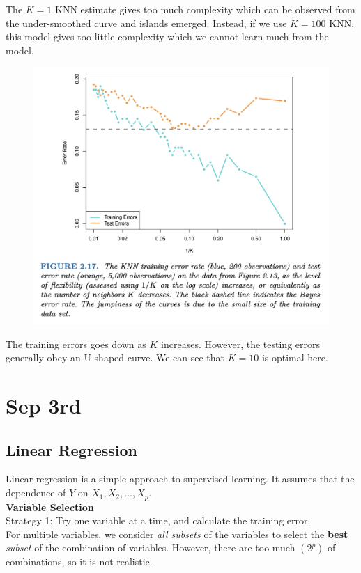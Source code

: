 \documentclass{article}
\begin{document}
The $K=1$ KNN estimate gives too much complexity which can be observed from the under-smoothed curve and islands emerged. Instead, if we use $K=100$ KNN, this model gives too little complexity which we cannot learn much from the model.
\newpage
\begin{figure}[h!]
    \centering
    \includegraphics[width=0.75\linewidth]{Training_testing_error.png}
    \label{fig:training-testing-error}
\end{figure}

The training errors goes down as $K$ increases. However, the testing errors generally obey an U-shaped curve. We can see that $K=10$ is optimal here.

\section{Sep 3rd}

\subsection{Linear Regression}

Linear regression is a simple approach to supervised learning. It assumes that the dependence of $Y$ on $X_1, X_2, \dots, X_p$.\\

\noindent \textbf{Variable Selection}\\

Strategy 1:
Try one variable at a time, and calculate the training error.\\

For multiple variables, we consider \textit{all subsets} of the variables to select the \textbf{best} \textit{subset} of the combination of variables. However, there are too much $(2^p)$ of combinations, so it is not realistic.\\
\end{document}
